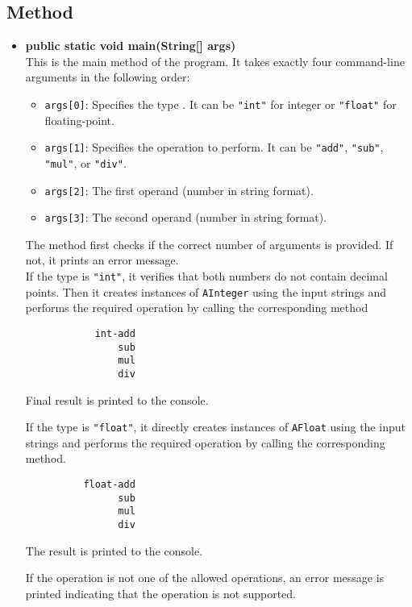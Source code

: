 \documentclass{article}
\begin{document}
\subsection*{Method}

\begin{itemize}
    \item \textbf{public static void main(String[] args)} \\
    This is the main method of the program. It takes exactly four command-line arguments in the following order:

    \begin{itemize}
        \item \texttt{args[0]}: Specifies the type . It can be \texttt{"int"} for integer or \texttt{"float"} for floating-point.
        \item \texttt{args[1]}: Specifies the operation to perform. It can be \texttt{"add"}, \texttt{"sub"}, \texttt{"mul"}, or \texttt{"div"}.
        \item \texttt{args[2]}: The first operand (number in string format).
        \item \texttt{args[3]}: The second operand (number in string format).
    \end{itemize}

    The method first checks if the correct number of arguments is provided. If not, it prints an error message.\\

    If the type is \texttt{"int"}, it verifies that both numbers do not contain decimal points. Then it creates instances of \texttt{AInteger} using the input strings and performs the required operation by calling the corresponding method \\
    \begin{verbatim}
            int-add
                sub
                mul
                div
    \end{verbatim}
    Final result is printed to the console.

    If the type is \texttt{"float"}, it directly creates instances of \texttt{AFloat} using the input strings and performs the required operation by calling the corresponding method. 
    \begin{verbatim}
          float-add
                sub
                mul
                div
    \end{verbatim}
    The result is printed to the console.

    If the operation is not one of the allowed operations, an error message is printed indicating that the operation is not supported.
    \end{itemize}
\end{document}
